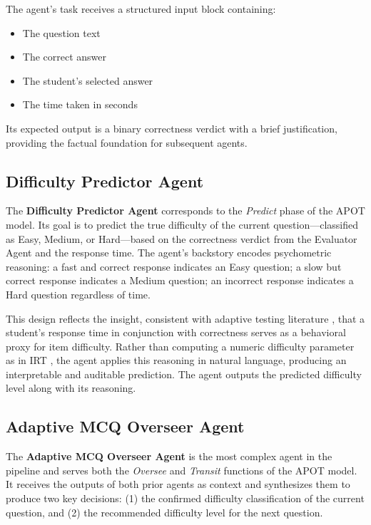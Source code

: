 \documentclass[conference]{IEEEtran}
\begin{document}
The agent's task receives a structured input block containing:
\begin{itemize}
    \item The question text
    \item The correct answer
    \item The student's selected answer
    \item The time taken in seconds
\end{itemize}
Its expected output is a binary correctness verdict with a brief justification, providing the factual foundation for subsequent agents.

\subsection{Difficulty Predictor Agent}

The \textbf{Difficulty Predictor Agent} corresponds to the \textit{Predict} phase of the APOT model. Its goal is to predict the true difficulty of the current question---classified as Easy, Medium, or Hard---based on the correctness verdict from the Evaluator Agent and the response time. The agent's backstory encodes psychometric reasoning: a fast and correct response indicates an Easy question; a slow but correct response indicates a Medium question; an incorrect response indicates a Hard question regardless of time.

This design reflects the insight, consistent with adaptive testing literature \cite{weiss2004}, that a student's response time in conjunction with correctness serves as a behavioral proxy for item difficulty. Rather than computing a numeric difficulty parameter as in IRT \cite{lord1980}, the agent applies this reasoning in natural language, producing an interpretable and auditable prediction. The agent outputs the predicted difficulty level along with its reasoning.

\subsection{Adaptive MCQ Overseer Agent}

The \textbf{Adaptive MCQ Overseer Agent} is the most complex agent in the pipeline and serves both the \textit{Oversee} and \textit{Transit} functions of the APOT model. It receives the outputs of both prior agents as context and synthesizes them to produce two key decisions: (1) the confirmed difficulty classification of the current question, and (2) the recommended difficulty level for the next question.
\end{document}

